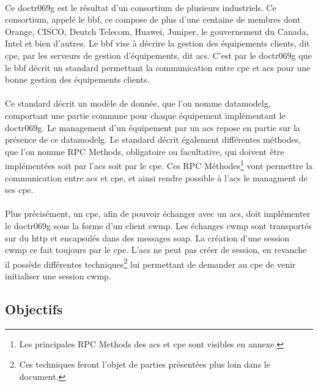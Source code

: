 \documentclass[12pt,a4paper]{report}
\begin{document}
\paragraph*{}Ce \gls{doctr069g} est le résultat d'un consortium de plusieurs industriels. Ce consortium, appelé le \gls{bbf}, ce compose de plus d'une centaine de membres dont Orange, CISCO, Deutch Telecom, Huawei, Juniper, le gouvernement du Canada, Intel et bien d'autres. Le \gls{bbf} vise à décrire la gestion des équipements clients, dit \gls{cpe}, par les serveurs de gestion d'équipements, dit \gls{acs}. C'est par le \gls{doctr069g} que le \gls{bbf} décrit un standard permettant la communication entre \gls{cpe} et \gls{acs} pour une bonne gestion des équipements clients.
\paragraph*{}Ce standard décrit un modèle de donnée, que l'on nomme \gls{datamodelg}, comportant une partie commune pour chaque équipement implémentant le \gls{doctr069g}. Le management d'un équipement par un \gls{acs} repose en partie sur la présence de ce \gls{datamodelg}. Le standard décrit également différentes méthodes, que l'on nomme RPC Methods, obligatoire ou facultative, qui doivent être implémentées soit par l'\gls{acs} soit par le \gls{cpe}. Ces RPC Méthodes\footnote{Les principales RPC Methods des \gls{acs} et \gls{cpe} sont visibles en annexe.} vont permettre la communication entre \gls{acs} et \gls{cpe}, et ainsi rendre possible à l'\gls{acs} le managment de ses \gls{cpe}.
\paragraph*{}Plus précisément, un \gls{cpe}, afin de pouvoir échanger avec un \gls{acs}, doit implémenter le \gls{doctr069g} sous la forme d'un client \gls{cwmp}. Les échanges \gls{cwmp} sont transportés sur du \gls{http} et encapsulés dans des messages \gls{soap}. La création d'une session \gls{cwmp} ce fait toujours par le \gls{cpe}. L'\gls{acs} ne peut pas créer de session, en revanche il possède différentes techniques\footnote{Ces techniques feront l'objet de parties présentées plus loin dans le document.} lui permettant de demander au \gls{cpe} de venir initialiser une session \gls{cwmp}. \\

\subsection{Objectifs}
\end{document}
